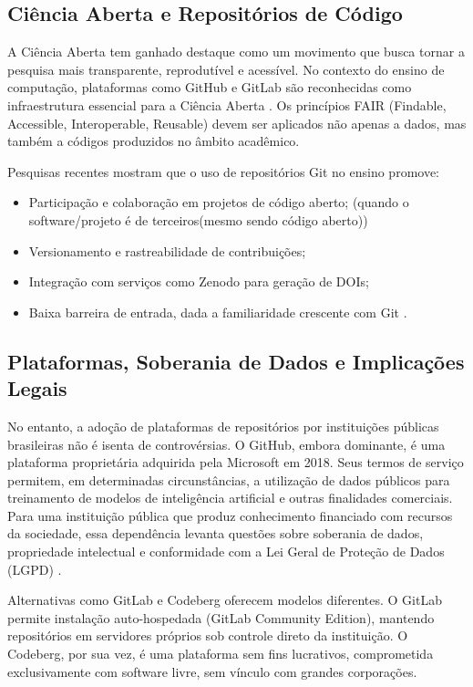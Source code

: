 \documentclass[english, spanish, brazilian]{RBIEarticle}
\begin{document}
\subsection{Ciência Aberta e Repositórios de Código}

A Ciência Aberta tem ganhado destaque como um movimento que busca tornar a pesquisa mais transparente, reprodutível e acessível. No contexto do ensino de computação, plataformas como GitHub e GitLab são reconhecidas como infraestrutura essencial para a Ciência Aberta \cite{momcheva2025}. Os princípios FAIR (Findable, Accessible, Interoperable, Reusable) devem ser aplicados não apenas a dados, mas também a códigos produzidos no âmbito acadêmico.

Pesquisas recentes mostram que o uso de repositórios Git no ensino promove:
\begin{itemize}
\item Participação e colaboração em projetos de código aberto; (quando o software/projeto é de terceiros(mesmo sendo código aberto))
\item Versionamento e rastreabilidade de contribuições;
\item Integração com serviços como Zenodo para geração de DOIs;
\item Baixa barreira de entrada, dada a familiaridade crescente com Git \cite{vanGeest2024}.
\end{itemize}

\subsection*{Plataformas, Soberania de Dados e Implicações Legais}

No entanto, a adoção de plataformas de repositórios por instituições públicas brasileiras não é isenta de controvérsias. O GitHub, embora dominante, é uma plataforma proprietária adquirida pela Microsoft em 2018. Seus termos de serviço permitem, em determinadas circunstâncias, a utilização de dados públicos para treinamento de modelos de inteligência artificial e outras finalidades comerciais. Para uma instituição pública que produz conhecimento financiado com recursos da sociedade, essa dependência levanta questões sobre soberania de dados, propriedade intelectual e conformidade com a Lei Geral de Proteção de Dados (LGPD) \cite{lgpd2018}.

Alternativas como GitLab e Codeberg oferecem modelos diferentes. O GitLab permite instalação auto-hospedada (GitLab Community Edition), mantendo repositórios em servidores próprios sob controle direto da instituição. O Codeberg, por sua vez, é uma plataforma sem fins lucrativos, comprometida exclusivamente com software livre, sem vínculo com grandes corporações.
\end{document}
